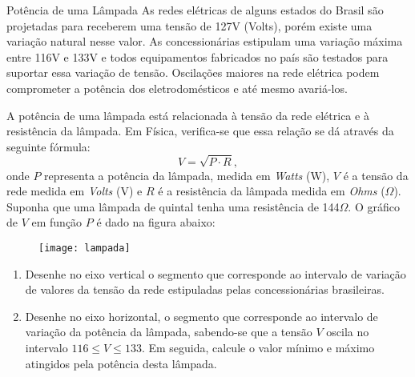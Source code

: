 \begin{task}{Potência de uma Lâmpada}
As redes elétricas de alguns estados do Brasil são projetadas para receberem uma tensão de 127V (Volts), porém existe uma variação natural nesse valor. As concessionárias estipulam uma variação máxima entre 116V e 133V e todos equipamentos fabricados no país são testados para suportar essa variação de tensão. Oscilações maiores na rede elétrica podem comprometer a potência dos eletrodomésticos e até mesmo avariá-los.

A potência de uma lâmpada está relacionada à tensão da rede elétrica e à resistência da lâmpada. Em Física, verifica-se que essa relação se dá através da seguinte fórmula:
$$
V = \sqrt{P\cdot R},
$$
onde $P$ representa a potência da lâmpada, medida em \emph{Watts} (W), $V$ é a tensão da rede medida em \emph{Volts} (V) e $R$ é a resistência da lâmpada medida em \emph{Ohms} ($\Omega$). Suponha que uma lâmpada de quintal tenha uma resistência de 144$\Omega$. O gráfico de $V$ em função $P$ é dado na figura abaixo: 

\begin{figure}[H]
\centering
\noindent\texttt{[image: lampada]}
\end{figure}

\begin{enumerate}
\item{}
Desenhe no eixo vertical o segmento que corresponde ao intervalo de variação de valores da tensão da rede estipuladas pelas concessionárias brasileiras.

\item{}
Desenhe no eixo horizontal, o segmento que corresponde ao intervalo de variação da potência da lâmpada, sabendo-se que a tensão $V$ oscila no intervalo $116\leq V \leq 133$. Em seguida, calcule o valor mínimo e máximo atingidos pela potência desta lâmpada.
\end{enumerate} 

\end{task}

\cleardoublepage

